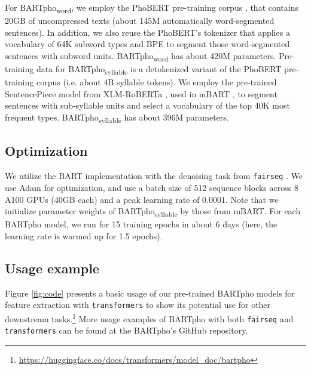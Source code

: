 \documentclass[a4paper]{article}
\begin{document}
For BARTpho\textsubscript{word}, we employ the PhoBERT pre-training corpus \cite{nguyen-tuan-nguyen-2020-phobert}, that contains 20GB of uncompressed texts (about 145M automatically word-segmented sentences). In addition, we also reuse the PhoBERT's tokenizer that applies a vocabulary of 64K subword types and BPE \cite{sennrich-etal-2016-neural} to segment those word-segmented sentences with subword units. BARTpho\textsubscript{word} has about 420M parameters. 
Pre-training data for BARTpho\textsubscript{syllable} is a detokenized variant of the PhoBERT pre-training corpus (i.e. about 4B syllable tokens). We employ the pre-trained SentencePiece model \cite{kudo-richardson-2018-sentencepiece} from XLM-RoBERTa \cite{conneau2019unsupervised}, used in mBART  \cite{tacl_a_00343}, to segment sentences with sub-syllable units and select a vocabulary of the top 40K most frequent types. BARTpho\textsubscript{syllable} has about 396M parameters. 

\subsection{Optimization}

We utilize the BART implementation with the denoising task from \texttt{fairseq} \cite{ott2019fairseq}. We use Adam \cite{KingmaB14} for optimization, and use a batch size of 512 sequence blocks across 8 A100 GPUs (40GB each) and a peak learning rate of 0.0001. Note that we initialize parameter weights of BARTpho\textsubscript{syllable} by those from mBART. For each BARTpho model, we run for 15 training epochs  in about 6 days (here, the learning rate is warmed up for 1.5 epochs).


\subsection{Usage example}

Figure \ref{fig:code} presents a basic usage of our pre-trained BARTpho models for feature extraction with  \texttt{transformers}  to show its potential use for other downstream tasks.\footnote{\url{https://huggingface.co/docs/transformers/model_doc/bartpho}} More usage examples of BARTpho with both \texttt{fairseq} and  \texttt{transformers} can be found at the BARTpho's GitHub repository.
\end{document}
